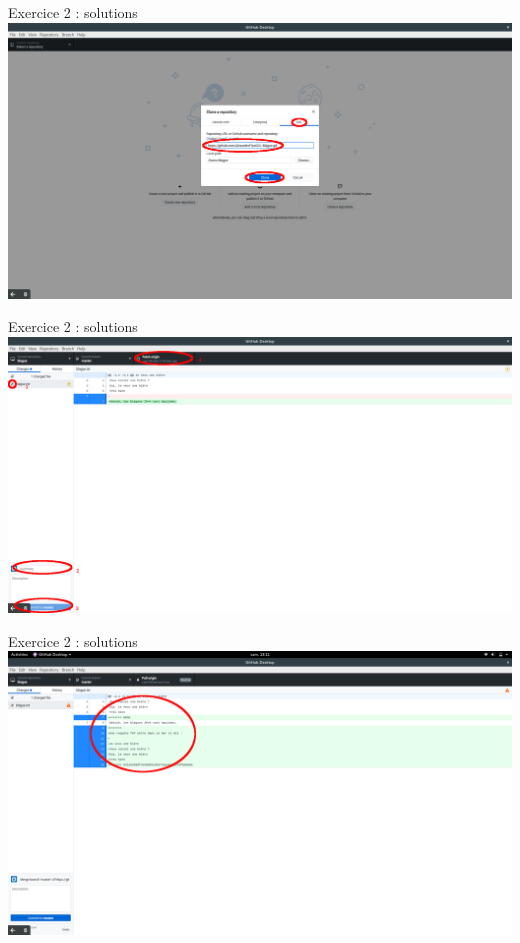 \documentclass{beamer}
\begin{document}
\begin{frame}{Exercice 2 : solutions}
	\centering
    \includegraphics[scale=0.16]{img/image_exercices/cloning_with_url.png}
\end{frame}

\begin{frame}{Exercice 2 : solutions}
	\centering
    \includegraphics[scale=0.16]{img/image_exercices/fetch_for_merge.png}
\end{frame}

\begin{frame}{Exercice 2 : solutions}
	\centering
    \includegraphics[scale=0.16]{img/image_exercices/conflic_to_resolve.png}
\end{frame}
\end{document}
